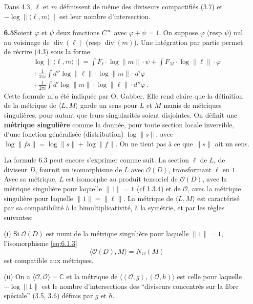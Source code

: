 \documentclass[12pt,a4paper]{article}
\theoremstyle{plain}
\theoremstyle{definition}
\theoremstyle{remark}
\DeclareMathOperator{\divm}{div}
\newcommand{\bbC}{\mathbb{C}}
\newcommand{\calO}{\mathcal{O}}
\begin{document}
Dans 4.3, $\ell$ et $m$ d\'efinissent de m\^eme des diviseurs compactifi\'es (3.7) et $-\log \| \langle \ell, m \rangle \|$ est leur nombre d'intersection.

\medskip
\noindent\textbf{6.5}\quad Soient $\varphi$ et $\psi$ deux fonctions $C^\infty$ avec $\varphi + \psi = 1$. On suppose $\varphi$ (resp $\psi$) nul au voisinage de $\divm(\ell)$ (resp $\divm(m)$). Une int\'egration par partie permet de r\'ecrire (4.3) sous la forme
\begin{equation}
\label{eq:6.5.1}
\begin{aligned}
\log \| \langle \ell, m \rangle \| = \int F_\ell \cdot \log \|m\| \cdot \psi + \int F_M \cdot \log \|\ell\| \cdot \varphi \\
+ \frac{1}{2\pi i} \int d'' \log \|\ell\| \cdot \log \|m\| \cdot d'\varphi \\
+ \frac{1}{2\pi i} \int d' \log \|m\| \cdot \log \|\ell\| \cdot d''\varphi \ .
\end{aligned}
\end{equation}
Cette formule m'a \'et\'e indiqu\'ee par O. Gabber. Elle rend claire que la d\'efinition de la m\'etrique de $\langle L, M \rangle$ garde un sens pour $L$ et $M$ munis de m\'etriques singuli\`eres, pour autant que leurs singularit\'es soient disjointes. On d\'efinit une \textbf{m\'etrique singuli\`ere} comme la donn\'ee, pour toute section locale inversible, d'une fonction g\'en\'eralis\'ee (distribution) $\log \|s\|$, avec $\log \|fs\| = \log \|s\| + \log \|f\|$. On ne tient pas \`a ce que $\|s\|$ ait un sens.

La formule 6.3 peut encore s'exprimer comme suit. La section $\ell$ de $L$, de diviseur $D$, fournit un isomorphisme de $L$ avec $\calO(D)$, transformant $\ell$ en $1$. Avec sa m\'etrique, $L$ est isomorphe au produit tensoriel de $\calO(D)$, avec la m\'etrique singuli\`ere pour laquelle $\|1\| = 1$ (cf 1.3.4) et de $\calO$, avec la m\'etrique singuli\`ere pour laquelle $\|1\| = \|\ell\|$. La m\'etrique de $\langle L, M \rangle$ est caract\'eris\'e par sa compatibilit\'e \`a la bimultiplicativit\'e, \`a la sym\'etrie, et par les r\`egles suivantes:

(i) Si $\calO(D)$ est muni de la m\'etrique singuli\`ere pour laquelle $\|1\| = 1$, l'isomorphisme \eqref{eq:6.1.3}
\[
\langle \calO(D), M \rangle = N_D(M)
\]
est compatible aux m\'etriques.

(ii) On a $\langle \calO, \calO \rangle = \bbC$ et la m\'etrique de $\langle (\calO, g), (\calO, h) \rangle$ est celle pour laquelle $-\log \|1\|$ est le nombre d'intersections des ``diviseurs concentr\'es sur la fibre sp\'eciale'' (3.5, 3.6) d\'efinis par $g$ et $h$.
\end{document}
